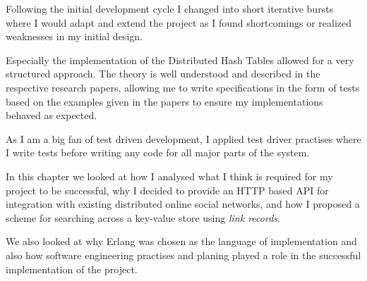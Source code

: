 Following the initial development cycle I changed into short iterative bursts where I would adapt and extend the project as I found shortcomings or realized weaknesses in my initial design.

Especially the implementation of the Distributed Hash Tables allowed for a very structured approach. The theory is well understood and described in the respective research papers, allowing me to write specifications in the form of tests based on the examples given in the papers to ensure my implementations behaved as expected.

As I am a big fan of test driven development, I applied test driver practises where I write tests before writing any code for all major parts of the system.

\mbox{}

In this chapter we looked at how I analysed what I think is required for my project to be successful, why I decided to provide an HTTP based API for integration with existing distributed online social networks, and how I proposed a scheme for searching across a key-value store using \emph{link records}.

We also looked at why Erlang was chosen as the language of implementation and also how software engineering practises and planing played a role in the successful implementation of the project.
